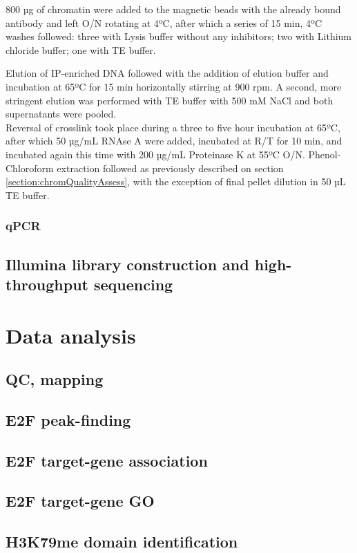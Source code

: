 \documentclass[11pt,twoside,a4paper]{report}
\begin{document}
			800 µg of chromatin were added to the magnetic beads with the already bound antibody and left O/N rotating at 4ºC, after which a series of 15 min, 4ºC washes followed: three with Lysis buffer without any inhibitors; two with Lithium chloride buffer; one with TE buffer.
			
			Elution of IP-enriched DNA followed with the addition of elution buffer and incubation at 65ºC for 15 min horizontally stirring at 900 rpm. A second, more stringent elution was performed with TE buffer with 500 mM NaCl and both supernatants were pooled. \\
			
			Reversal of crosslink took place during a three to five hour incubation at 65ºC, after which 50 µg/mL RNAse A were added, incubated at R/T for 10 min, and incubated again this time with 200 µg/mL Proteinase K at 55ºC O/N. Phenol-Chloroform extraction followed as previously described on section \ref{section:chromQualityAssess}, with the exception of final pellet dilution in 50 µL TE buffer.
			\subsubsection{qPCR}
		
		
		\subsection{Illumina library construction and high-throughput sequencing}
		
	\section{Data analysis}
		\subsection{QC, mapping}
		\subsection{E2F peak-finding}
		\subsection{E2F target-gene association}
		\subsection{E2F target-gene GO}
		\subsection{H3K79me domain identification}
\end{document}
